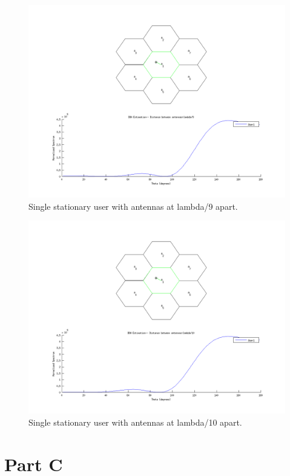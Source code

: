 \documentclass{article}
\begin{document}
\begin{figure}[h]
\centerline{\includegraphics[width=5in]{doc/partB9.png}}
\caption{Single stationary user with antennas at lambda/9 apart.}
\label{partb9}
\end{figure}

\begin{figure}[h]
\centerline{\includegraphics[width=5in]{doc/partB10.png}}
\caption{Single stationary user with antennas at lambda/10 apart.}
\label{partb10}
\end{figure}

\clearpage

\section{Part C}\label{partC}
\end{document}
